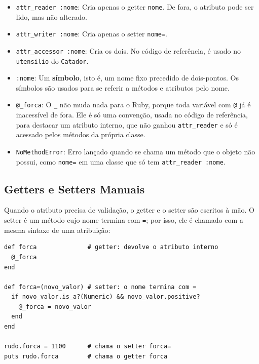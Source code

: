 \begin{itemize}
    \item \texttt{attr\_reader :nome}: Cria apenas o getter \texttt{nome}. De fora, o atributo
    pode ser lido, mas não alterado.

    \item \texttt{attr\_writer :nome}: Cria apenas o setter \texttt{nome=}.

    \item \texttt{attr\_accessor :nome}: Cria os dois. No código de referência, é usado no
    \texttt{utensilio} do \texttt{Catador}.

    \item \texttt{:nome}: Um \textbf{símbolo}, isto é, um nome fixo precedido de dois-pontos. Os
    símbolos são usados para se referir a métodos e atributos pelo nome.

    \item \texttt{@\_forca}: O \texttt{\_} não muda nada para o Ruby, porque toda variável com
    \texttt{@} já é inacessível de fora. Ele é só uma convenção, usada no código de referência,
    para destacar um atributo interno, que não ganhou \texttt{attr\_reader} e só é acessado
    pelos métodos da própria classe.

    \item \texttt{NoMethodError}: Erro lançado quando se chama um método que o objeto não
    possui, como \texttt{nome=} em uma classe que só tem \texttt{attr\_reader :nome}.
\end{itemize}

\subsection{Getters e Setters Manuais}

Quando o atributo precisa de validação, o getter e o setter são escritos à mão. O setter é um
método cujo nome termina com \texttt{=}; por isso, ele é chamado com a mesma sintaxe de uma
atribuição:

\begin{lstlisting}[style=ruby]
def forca              # getter: devolve o atributo interno
  @_forca
end

def forca=(novo_valor) # setter: o nome termina com =
  if novo_valor.is_a?(Numeric) && novo_valor.positive?
    @_forca = novo_valor
  end
end

rudo.forca = 1100      # chama o setter forca=
puts rudo.forca        # chama o getter forca
\end{lstlisting}

